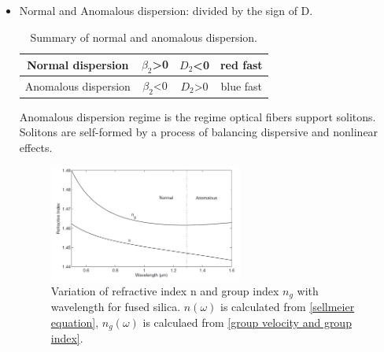 \documentclass[12pt]{extarticle}
\numberwithin{equation}{section}
\numberwithin{figure}{section}
\numberwithin{table}{section}
\newcommand{\<}{\langle}
\renewcommand{\>}{\rangle}
\theoremstyle{definition}
\begin{document}
\begin{itemize}
                \item Normal and Anomalous dispersion: divided by the sign of D.
                    \begin{table}[htbp]
                    \centering
                    \begin{tabular}{|c|c|c|c|}
                        \hline
                        Normal dispersion    & $\beta_2$\textgreater{}0 & $D_2$\textless{}0    & red fast  \\ \hline
                        Anomalous dispersion & $\beta_2$\textless{}0    & $D_2$\textgreater{}0 & blue fast \\ \hline
                    \end{tabular}
                    \caption{Summary of normal and anomalous dispersion.}
                    \label{Summary of normal and anomalous dispersion}
                    \end{table}
                    
                    Anomalous dispersion regime is the regime optical fibers support solitons. Solitons are self-formed by a process of balancing dispersive and nonlinear effects.
                    \begin{figure}[htbp]
                        \centering
                        \includegraphics[width=0.6\textwidth]{images/fig1.4.PNG}
                        \caption{Variation of refractive index n and group index $n_g$ with wavelength for fused silica. $n(\omega)$ is calculated from \autoref{sellmeier equation}, $n_g(\omega)$ is calculaed from \autoref{group velocity and group index}.}
                        \label{fig1.4}
                    \end{figure}
                    

\end{itemize}
\end{document}
